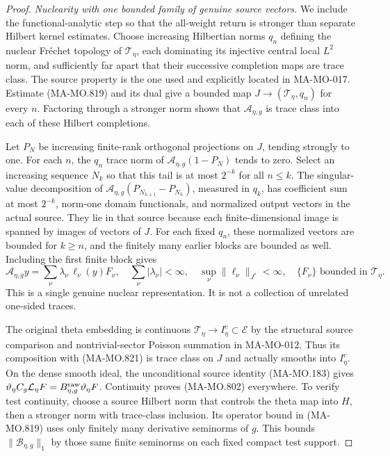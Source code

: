 \begin{proof}
\emph{Nuclearity with one bounded family of genuine source vectors.}
We include the functional-analytic step so that the
all-weight return is stronger than separate Hilbert
kernel estimates. Choose increasing Hilbertian norms
\(q_n\) defining the nuclear Fr\'echet topology of
\(\mathcal T_\eta\), each dominating its injective
central local \(L^2\) norm, and sufficiently far apart
that their successive completion maps are trace class.
The source property is the one used and explicitly
located in MA-MO-017. Estimate (MA-MO.819) and its
dual give a bounded map \(J\to(\mathcal T_\eta,q_n)\)
for every \(n\).
Factoring through a stronger norm shows that
\(\mathcal A_{\eta,g}\) is trace class into each
of these Hilbert completions.

Let \(P_N\) be increasing finite-rank orthogonal
projections on \(J\), tending strongly to one.
For each \(n\), the \(q_n\) trace norm of
\(\mathcal A_{\eta,g}(1-P_N)\) tends to zero.
Select an increasing sequence \(N_k\) so that this
tail is at most \(2^{-k}\) for all \(n\le k\).
The singular-value decomposition of
\(\mathcal A_{\eta,g}(P_{N_{k+1}}-P_{N_k})\),
measured in \(q_k\), has coefficient sum at most
\(2^{-k}\), norm-one domain functionals, and
normalized output vectors in the actual source.
They lie in that source because each finite-dimensional
image is spanned by images of vectors of \(J\).
For each fixed \(q_n\), these normalized vectors
are bounded for \(k\ge n\), and the finitely many
earlier blocks are bounded as well. Including the
first finite block gives
\[
 \mathcal A_{\eta,g}y
     =\sum_\nu \lambda_\nu\,\ell_\nu(y)F_\nu,
 \quad
 \sum_\nu|\lambda_\nu|<\infty,\quad
 \sup_\nu\|\ell_\nu\|_{J^*}<\infty,\quad
 \{F_\nu\}\text{ bounded in }\mathcal T_\eta .
 \tag{MA-MO.821}
\]
This is a single genuine nuclear representation.
It is not a collection of unrelated one-sided traces.

The original theta embedding is continuous
\(\mathcal T_\eta\to I_\eta^c\subset\mathcal E\)
by the structural source comparison and nontrivial-sector
Poisson summation in MA-MO-012. Thus its composition
with (MA-MO.821) is trace class on \(J\) and actually
smooths into \(I_\eta^c\). On the dense smooth ideal,
the unconditional source identity (MA-MO.183) gives
\(\vartheta_\eta C_g\mathcal L_\eta F
=B^{\rm raw}_{\eta,g}\vartheta_\eta F\).
Continuity proves (MA-MO.802) everywhere.
To verify test continuity, choose a source Hilbert
norm that controls the theta map into \(H\), then
a stronger norm with trace-class inclusion. Its
operator bound in (MA-MO.819) uses only finitely
many derivative seminorms of \(g\). This bounds
\(\|\mathcal B_{\eta,g}\|_1\) by those same finite
seminorms on each fixed compact test support.


\end{proof}
